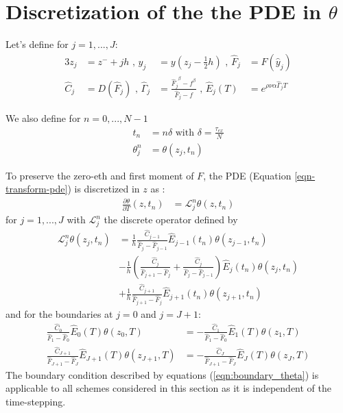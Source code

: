 \documentclass[]{rAMF2e}
\begin{document}
\section{Discretization of the the PDE in $\theta$}
Let's define for $j=1,...,J$:
\begin{alignat}{3}
z_j &= z^{-} + jh \text{ , } \hat{y}_j&=y(z_j - \frac{1}{2}h) \text{ , } \hat{F}_j&=F(\hat{y}_j)\\
\hat{C}_j&=D(\hat{F}_j) \text{ , } \hat{\Gamma}_j &= \frac{{\hat{F}_j}^{\beta}-f^{\beta}}{\hat{F}_j-f} \text{ , } \hat{E}_j(T)&=e^{\rho\nu\alpha\hat{\Gamma}_j T}
\end{alignat}

We also define for $n=0,...,N-1$
\begin{align}
t_n &= n \delta \text{ with } \delta = \frac{\tau_{ex}}{N} \\
\theta_j^n &= \theta(z_j,t_n)
\end{align}

To preserve the zero-eth and first moment of $F$, the PDE (Equation \ref{eqn-transform-pde}) is discretized in $z$ as \citep{hagan2013change}:
\begin{align}
\frac{\partial \theta}{\partial T}(z, t_n) &= \mathcal{L}_{j}^n \theta(z, t_n)
\end{align}
for $j=1,...,J$ with $\mathcal{L}_{j}^n$ the discrete operator defined by
\begin{align}
  \mathcal{L}_{j}^n\theta(z_j, t_n) &= \frac{1}{h} \frac{\hat{C}_{j-1}}{\hat{F}_{j}-\hat{F}_{j-1}}\hat{E}_{j-1}(t_n)\theta(z_{j-1},t_n)\\
  &-\frac{1}{h}\left(\frac{\hat{C}_{j}}{\hat{F}_{j+1}-\hat{F}_j}+\frac{\hat{C}_{j}}{\hat{F}_{j}-\hat{F}_{j-1}}\right)\hat{E}_{j}(t_n)\theta(z_j,t_n)\\
  &+\frac{1}{h}\frac{\hat{C}_{j+1}}{\hat{F}_{j+1}-\hat{F}_j}\hat{E}_{j+1}(t_n)\theta(z_{j+1},t_n)
\end{align}
and for the boundaries at $j=0$ and $j=J+1$:
\begin{subequations}\label{eqn:boundary_theta}
\begin{align}
\frac{\hat{C}_0}{\hat{F}_1-\hat{F}_0}\hat{E}_0(T) \theta(z_0,T) &= - \frac{\hat{C}_1}{\hat{F}_1-\hat{F}_0}\hat{E}_1(T) \theta(z_1,T) \\
\frac{\hat{C}_{J+1}}{\hat{F}_{J+1}-\hat{F}_J}\hat{E}_{J+1}(T) \theta(z_{J+1},T) &= - \frac{\hat{C}_J}{\hat{F}_{J+1}-\hat{F}_{J}}\hat{E}_J(T) \theta(z_J,T)
\end{align}
\end{subequations}
The boundary condition described by equations (\ref{eqn:boundary_theta}) is applicable to all schemes considered in this section as it is independent of the time-stepping.
\end{document}
